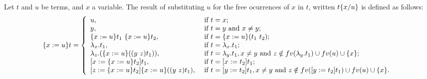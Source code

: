 Let $t$ and $u$ be terms, and $x$ a variable. The result of substituting $u$ for the free ocurrences of $x$ in $t$, written $t\{x / u\}$ is defined as follows:\newline
\begin{equation}\label{msubst}
\metasub{t}{x}{u} = \left\{
 \begin{array}{ll}
  u, & \mbox{ if } t = x; \\
  y, & \mbox{ if } t = y \mbox{ and } x \neq y; \\
  \metasub{t_1}{x}{u}\ \metasub{t_2}{x}{u}, & \mbox{ if } t = \metasub{(t_1\ t_2)}{x}{u}; \\
  \lambda_x.t_1, & \mbox{ if } t = \lambda_x.t_1; \\
  \lambda_z.(\metasub{(\swap{y}{z}{t_1})}{x}{u}), & \mbox{ if } t = \lambda_y.t_1, x \neq y \mbox{ and } z\notin fv(\lambda_y.t_1)\cup fv(u) \cup \{x\}; \\
  \esub{t_1}{x}{\metasub{t_2}{x}{u}}, & \mbox{ if } t = \esub{t_1}{x}{t_2}; \\
  \esub{\metasub{(\swap{y}{z}{t_1})}{x}{u}}{z}{\metasub{t_2}{x}{u}}, & \mbox{ if } t = \esub{t_1}{y}{t_2}, x \neq y \mbox{ and } z\notin fv(\esub{t_1}{y}{t_2})\cup fv(u) \cup \{x\}.
 \end{array}\right.
\end{equation}


